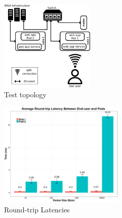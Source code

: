 \documentclass[letterpaper,twocolumn,10pt]{article}
\begin{document}
 
\begin{figure}[th]
\centering\includegraphics[width=0.4\textwidth]{images/clus.png}
\caption{Test topology}
\label{fig:clus}
\end{figure}
\begin{figure}[th]
\centering\includegraphics[width=0.53\textwidth]{images/graph.png}
\caption{Round-trip Latencies}
\label{fig:lat}
\end{figure}

%
% 
\end{document}

